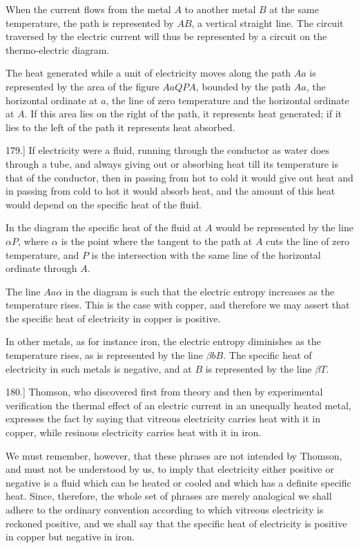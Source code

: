 \documentclass[12pt,oneside]{book}[2021/10/04]
\newcommand{\Runhead}[1]{\fancyhead[C]{\iffloatpage{}{\small#1}}}
\newcommand{\article}[1]{\phantomsection \label{art:#1}{#1.]}}
\newcommand{\¬}{\hphantom{0}}
\begin{document}
When the current flows from the metal \(A\) to another metal \(B\)
at the same temperature, the path is represented by \(AB\), a vertical
straight line. The circuit traversed by the electric current will
thus be represented by a circuit on the thermo-electric diagram.

The heat generated while a unit of electricity moves along the
path \(Aa\) is represented by the area of the figure \(AaQPA\), bounded
by the path \(Aa\), the horizontal ordinate at \(a\), the line of zero temperature
and the horizontal ordinate at \(A\). If this area lies on the
right of the path, it represents heat generated; if it lies to the left
of the path it represents heat absorbed.

\article{179} If electricity were a fluid, running through the conductor
as water does through a tube, and always giving out or absorbing
heat till its temperature is that of the conductor, then in passing
from hot to cold it would give out heat and in passing from cold to
hot it would absorb heat, and the amount of this heat would depend
on the specific heat of the fluid.

In the diagram the specific heat of the fluid at \(A\) would be
represented by the line \(\alpha P\), where \(\alpha\) is the point where the tangent
to the path at \(A\) cuts the line of zero temperature, and \(P\)
is the intersection with the same line of the horizontal ordinate
through \(A\).

The line \(Aa \alpha\) in the diagram is such that the electric entropy
increases as the temperature rises. This is the case with copper,
and therefore we may assert that the specific heat of electricity in
copper is positive.
\Runhead{SPECIFIC HEAT OF ELECTRICITY.}

In other metals, as for instance iron, the electric entropy
diminishes as the temperature rises, as is represented by the line
\(\beta bB\). The specific heat of electricity in such metals is negative,
and at \(B\) is represented by the line \(\beta T\).

\article{180} Thomson, who discovered first from theory and then by
experimental verification the thermal effect of an electric current in
an unequally heated metal, expresses the fact by saying that
vitreous electricity carries heat with it in copper, while resinous
electricity carries heat with it in iron.

We must remember, however, that these phrases are not intended
by Thomson, and must not be understood by us, to imply
that electricity either positive or negative is a fluid which can
be heated or cooled and which has a definite specific heat. Since,
therefore, the whole set of phrases are merely analogical we shall
adhere to the ordinary convention according to which vitreous
electricity is reckoned positive, and we shall say that the specific
heat of electricity is positive in copper but negative in iron.
\end{document}
